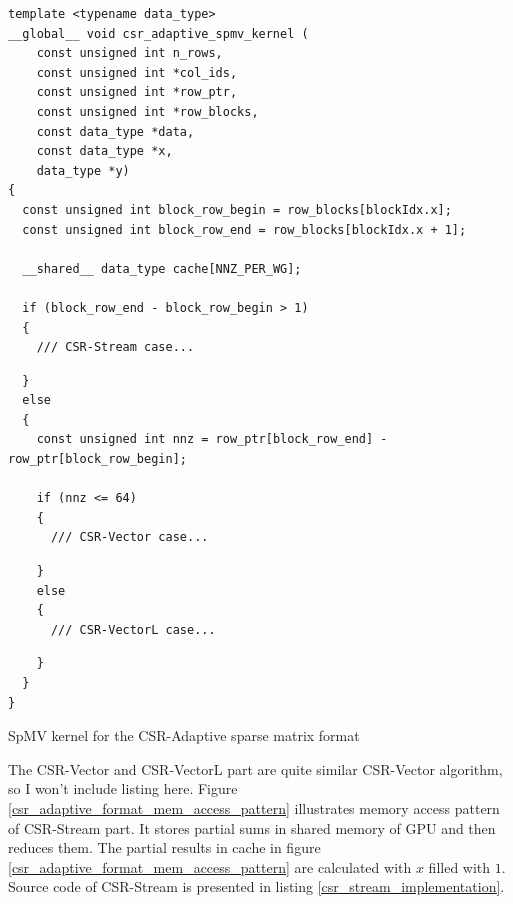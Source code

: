 \documentclass{article}
\begin{document}
\begin{listing}[H]
\begin{verbatim}
template <typename data_type>
__global__ void csr_adaptive_spmv_kernel (
    const unsigned int n_rows,
    const unsigned int *col_ids,
    const unsigned int *row_ptr,
    const unsigned int *row_blocks,
    const data_type *data,
    const data_type *x,
    data_type *y)
{
  const unsigned int block_row_begin = row_blocks[blockIdx.x];
  const unsigned int block_row_end = row_blocks[blockIdx.x + 1];

  __shared__ data_type cache[NNZ_PER_WG];

  if (block_row_end - block_row_begin > 1)
  {
    /// CSR-Stream case...
\end{verbatim}
\begin{verbatim}
  }
  else
  {
    const unsigned int nnz = row_ptr[block_row_end] - row_ptr[block_row_begin];

    if (nnz <= 64)
    {
      /// CSR-Vector case...
\end{verbatim}
\begin{verbatim}
    }
    else
    {
      /// CSR-VectorL case...
\end{verbatim}
\begin{verbatim}
    }
  }
}
\end{verbatim}
\caption{SpMV kernel for the CSR-Adaptive sparse matrix format}
\label{csr_adaptive}
\end{listing}


The CSR-Vector and CSR-VectorL part are quite similar CSR-Vector algorithm, so I won't include listing here. Figure \ref{csr_adaptive_format_mem_access_pattern}
illustrates memory access pattern of CSR-Stream part. It stores partial sums in shared memory of GPU and then reduces them. The partial results in cache in
figure \ref{csr_adaptive_format_mem_access_pattern} are calculated with $x$ filled with $1$. Source code of CSR-Stream is presented in listing \ref{csr_stream_implementation}.
\end{document}
